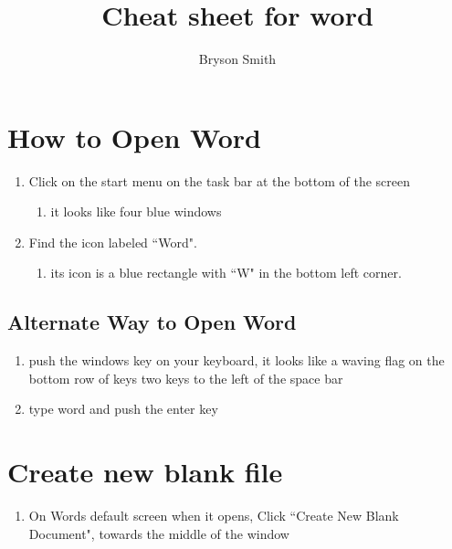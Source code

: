 \documentclass[12pt,letterpaper]{article}
\title{Cheat sheet for word}
\author{Bryson Smith}
\begin{document}
\maketitle
\section{How to Open Word}

\begin{enumerate}
\item Click on the start menu on the task bar at the bottom of the screen
	\begin{enumerate}
	    \item it looks like four blue windows
	\end{enumerate}
\item Find the icon labeled ``Word".
	\begin{enumerate}
	    \item its icon is a blue rectangle with ``W" in the bottom left corner.
	\end{enumerate}
\end{enumerate}
\subsection{Alternate Way to Open Word}
\begin{enumerate}
    \item push the windows key on your keyboard, it looks like a waving flag on the bottom row of keys two keys to the left of the space bar
    \item type word and push the enter key
\end{enumerate}
\section{Create new blank file}
\begin{enumerate}
    \item On Words default screen when it opens, Click ``Create New Blank Document", towards the middle of the window
\end{enumerate}
\end{document}
